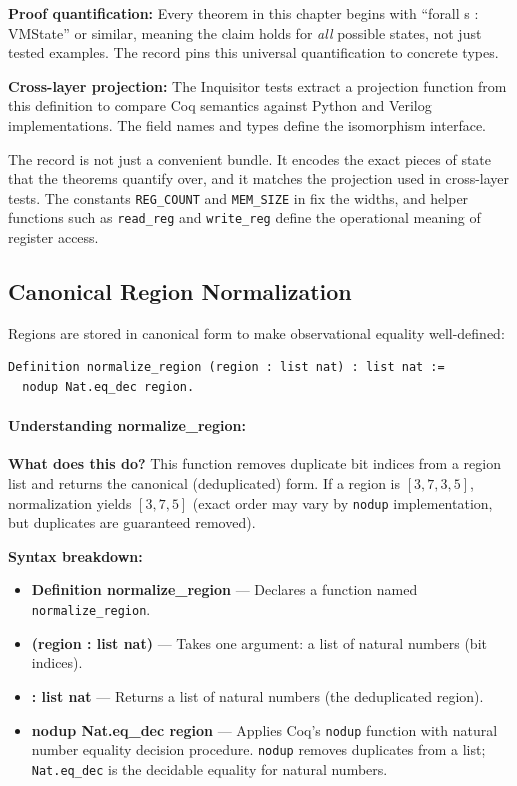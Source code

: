\textbf{Proof quantification:} Every theorem in this chapter begins with ``forall s : VMState'' or similar, meaning the claim holds for \textit{all} possible states, not just tested examples. The record pins this universal quantification to concrete types.

\textbf{Cross-layer projection:} The Inquisitor tests extract a projection function from this definition to compare Coq semantics against Python and Verilog implementations. The field names and types define the isomorphism interface.

The record is not just a convenient bundle. It encodes the exact pieces of state that the theorems quantify over, and it matches the projection used in cross-layer tests. The constants \texttt{REG\_COUNT} and \texttt{MEM\_SIZE} in  fix the widths, and helper functions such as \texttt{read\_reg} and \texttt{write\_reg} define the operational meaning of register access.

\subsection{Canonical Region Normalization}

Regions are stored in canonical form to make observational equality well-defined:
\begin{lstlisting}
Definition normalize_region (region : list nat) : list nat :=
  nodup Nat.eq_dec region.
\end{lstlisting}

\paragraph{Understanding normalize\_region:}

\textbf{What does this do?} This function removes duplicate bit indices from a region list and returns the canonical (deduplicated) form. If a region is $[3, 7, 3, 5]$, normalization yields $[3, 7, 5]$ (exact order may vary by \texttt{nodup} implementation, but duplicates are guaranteed removed).

\textbf{Syntax breakdown:}
\begin{itemize}
    \item \textbf{Definition normalize\_region} — Declares a function named \texttt{normalize\_region}.
    \item \textbf{(region : list nat)} — Takes one argument: a list of natural numbers (bit indices).
    \item \textbf{: list nat} — Returns a list of natural numbers (the deduplicated region).
    \item \textbf{nodup Nat.eq\_dec region} — Applies Coq's \texttt{nodup} function with natural number equality decision procedure. \texttt{nodup} removes duplicates from a list; \texttt{Nat.eq\_dec} is the decidable equality for natural numbers.
\end{itemize}

